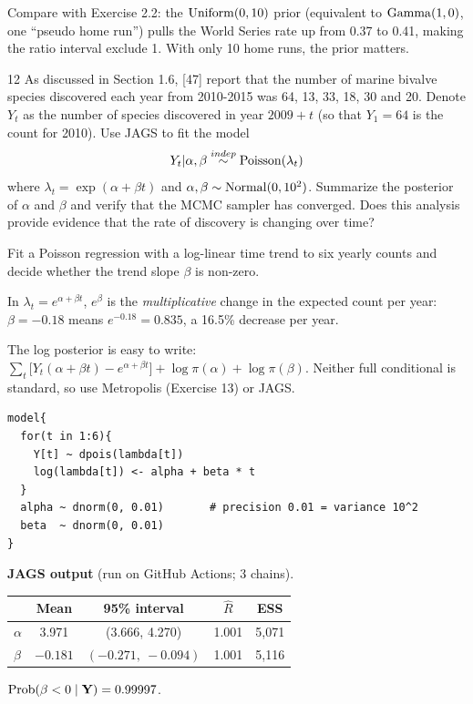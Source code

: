 \documentclass[11pt]{article}
\newenvironment{jagsbox}{\begin{sanity}\small\textbf{JAGS output} (run on GitHub Actions; 3 chains).\par\smallskip\centering}{\end{sanity}}
\newcommand{\JAGSextwelve}{\begin{jagsbox}
\begin{tabular}{lcccc}\toprule
 & Mean & 95\% interval & $\hat R$ & ESS\\\midrule
$\alpha$ & 3.971 & (3.666, 4.270) & 1.001 & 5{,}071\\
$\beta$ & $-0.181$ & $(-0.271,\ -0.094)$ & 1.001 & 5{,}116\\\bottomrule
\end{tabular}\par\smallskip
$\Prob(\beta<0\mid\mathbf Y)=0.99997$.
\end{jagsbox}}
\begin{document}
\begin{takeaway}
Compare with Exercise 2.2: the $\mathrm{Uniform}(0,10)$ prior (equivalent to $\mathrm{Gamma}(1,0)$, one ``pseudo home run'') pulls the World Series rate up from 0.37 to 0.41, making the ratio interval exclude 1. With only 10 home runs, the prior matters.
\end{takeaway}


\begin{problem}{12}
As discussed in Section 1.6, [47] report that the number of marine bivalve species discovered each year from 2010-2015 was 64, 13, 33, 18, 30 and 20. Denote $Y_t$ as the number of species discovered in year $2009+t$ (so that $Y_1=64$ is the count for 2010). Use JAGS to fit the model
\[
Y_t|\alpha,\beta\overset{indep}{\sim}\mathrm{Poisson}(\lambda_t)
\]
where $\lambda_t=\exp(\alpha+\beta t)$ and $\alpha,\beta\sim\mathrm{Normal}(0,10^2)$. Summarize the posterior of $\alpha$ and $\beta$ and verify that the MCMC sampler has converged. Does this analysis provide evidence that the rate of discovery is changing over time?
\end{problem}

\begin{restate}
Fit a Poisson regression with a log-linear time trend to six yearly counts and decide whether the trend slope $\beta$ is non-zero.
\end{restate}

\begin{recall}
In $\lambda_t=e^{\alpha+\beta t}$, $e^{\beta}$ is the \emph{multiplicative} change in the expected count per year: $\beta=-0.18$ means $e^{-0.18}=0.835$, a 16.5\% decrease per year.
\end{recall}

\begin{keyidea}
The log posterior is easy to write: $\sum_t\big[Y_t(\alpha+\beta t)-e^{\alpha+\beta t}\big]+\log\pi(\alpha)+\log\pi(\beta)$. Neither full conditional is standard, so use Metropolis (Exercise 13) or JAGS.
\end{keyidea}

\solution
{}
\begin{lstlisting}
model{
  for(t in 1:6){
    Y[t] ~ dpois(lambda[t])
    log(lambda[t]) <- alpha + beta * t
  }
  alpha ~ dnorm(0, 0.01)       # precision 0.01 = variance 10^2
  beta  ~ dnorm(0, 0.01)
}
\end{lstlisting}
\JAGSextwelve
\end{document}
